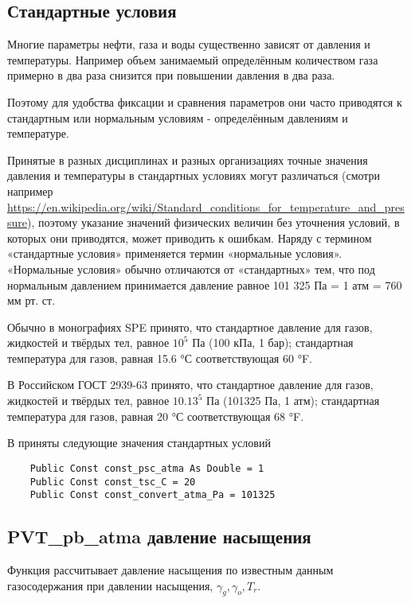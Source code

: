 \subsection{Стандартные условия} 
Многие параметры нефти, газа и воды существенно зависят от давления и температуры. Например объем занимаемый определённым количеством газа примерно в два раза снизится при повышении давления в два раза. 

Поэтому для удобства фиксации и сравнения параметров они часто приводятся к стандартным или нормальным условиям - определённым давлениям и температуре. 
	
	Принятые в разных дисциплинах и разных организациях точные значения давления и температуры в стандартных условиях могут различаться (смотри например \url{https://en.wikipedia.org/wiki/Standard_conditions_for_temperature_and_pressure}), поэтому указание значений физических величин без уточнения условий, в которых они приводятся, может приводить к ошибкам. Наряду с термином «стандартные условия» применяется термин «нормальные условия». «Нормальные условия» обычно отличаются от «стандартных» тем, что под нормальным давлением принимается давление равное 101 325 Па = 1 атм = 760 мм рт. ст.
	
	Обычно в монографиях SPE принято, что стандартное давление для газов, жидкостей и твёрдых тел, равное $10^5$ Па (100 кПа, 1 бар); стандартная температура для газов, равная 15.6 °С соответствующая 60 °F. 
	
	В Российском ГОСТ 2939-63  принято, что стандартное давление для газов, жидкостей и твёрдых тел, равное $10.13^5$ Па (101325 Па, 1 атм); стандартная температура для газов, равная 20 °С соответствующая 68 °F. 
	
	В \unf{} приняты следующие значения стандартных условий
	
	
	\begin{listing}[H]
	\begin{verbatim}
	Public Const const_psc_atma As Double = 1
	Public Const const_tsc_C = 20
	Public Const const_convert_atma_Pa = 101325
	\end{verbatim}
\end{listing}

 

\subsection{PVT\_pb\_atma давление насыщения}
Функция рассчитывает давление насыщения по известным данным газосодержания при давлении насыщения, $\gamma_g, \gamma_o, T_r$.

